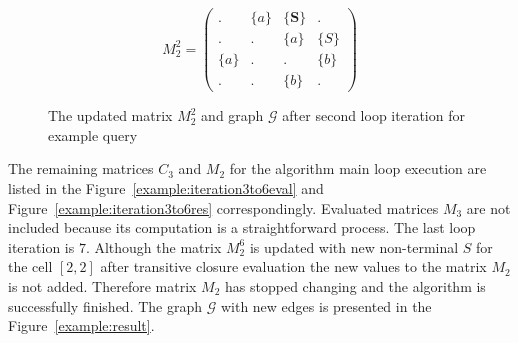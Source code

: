 \begin{figure}
    \begin{subfigure}[]{0.5\textwidth}
    \centering
    $$
    M_2^2 =
    \begin{pmatrix}
    .     & \{a\} & \{\textbf{S}\} & .     \\
    .     & .     & \{a\} & \{S\} \\
    \{a\} & .     & .     & \{b\} \\
    .     & .     & \{b\} & .
    \end{pmatrix}
    $$
    \end{subfigure}
    \begin{subfigure}[]{0.4\textwidth}
    \centering
    \end{subfigure}
    \caption{The updated matrix $M_2^2$ and graph $\mathcal{G}$ after second loop iteration for example query}
    \label{example:iteration2res}
\end{figure}

The remaining matrices $C_3$ and $M_2$ for the algorithm main loop execution are listed in the Figure~\ref{example:iteration3to6eval} and Figure~\ref{example:iteration3to6res} correspondingly. Evaluated matrices $M_3$ are not included because its computation is a straightforward process. The last loop iteration is $7$. Although the matrix $M_2^6$ is updated with new non-terminal $S$ for the cell $[2,2]$ after transitive closure evaluation the new values to the matrix $M_2$ is not added. Therefore matrix $M_2$ has stopped changing and the algorithm is successfully finished. The graph $\mathcal{G}$ with new edges is presented in the Figure~\ref{example:result}.

